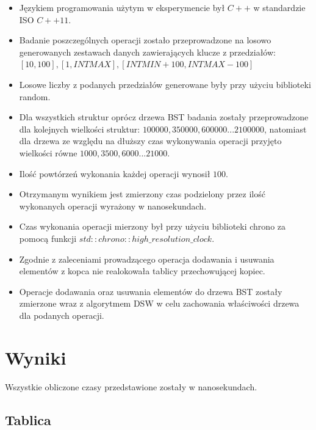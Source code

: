 \documentclass{article}
\begin{document}
\begin{itemize}
    \item Językiem programowania użytym w eksperymencie był $C++$ w standardzie ISO $C++11$.
    \item Badanie poszczególnych operacji zostało przeprowadzone na losowo generowanych zestawach danych zawierających klucze z przedziałów: \\$[10,100],[1,INTMAX], [INTMIN+100,INTMAX-100]$
    \item Losowe liczby z podanych przedziałów generowane były przy użyciu biblioteki random.
    \item Dla wszystkich struktur oprócz drzewa BST badania zostały przeprowadzone dla kolejnych wielkości struktur: $100000, 350000, 600000 ... 2100000$, natomiast dla drzewa ze względu na dłuższy czas wykonywania operacji przyjęto wielkości równe $1000,3500,6000 ... 21000$.
    \item Ilość powtórzeń wykonania każdej operacji wynosił $100$.
    \item Otrzymanym wynikiem jest zmierzony czas podzielony przez ilość wykonanych operacji wyrażony w nanosekundach.
    \item Czas wykonania operacji mierzony był przy użyciu biblioteki chrono za pomocą funkcji $std::chrono::high\_resolution\_clock$.
    \item Zgodnie z zaleceniami prowadzącego operacja dodawania i usuwania elementów z kopca nie realokowała tablicy przechowującej kopiec.
    \item Operacje dodawania oraz usuwania elementów do drzewa BST zostały zmierzone wraz z algorytmem DSW w celu zachowania właściwości drzewa dla podanych operacji.
\end{itemize}

\section{Wyniki}

Wszystkie obliczone czasy przedstawione zostały w nanosekundach.

\subsection{Tablica}
\end{document}
